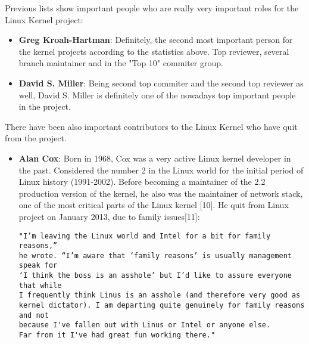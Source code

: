 \documentclass[11pt]{article}
\begin{document}
Previous lists show important people who are really very important roles for the Linux Kernel project:
\begin{itemize}\itemsep0pt
\item{\textbf{Greg Kroah-Hartman}}: Definitely, the second most important person for the kernel projects according to the statistics above. Top reviewer, several branch maintainer and in the "Top 10" commiter group.
\item{\textbf{David S. Miller}}: Being second top commiter and the second top reviewer as well, David S. Miller is definitely one of the nowadays top important people in the project.
\end{itemize}
There have been also important contributors to the Linux Kernel who have quit from the project.
\begin{itemize}\itemsep0pt
\item{\textbf{Alan Cox}}: Born in 1968, Cox was a very active Linux kernel developer in the past. Considered the number 2 in the Linux world for the initial period of Linux history (1991-2002). Before becoming a maintainer of the 2.2 production version of the kernel, he also was the maintainer of network stack, one of the most critical parts of the Linux kernel [10]. He quit from Linux project on January 2013, due to family issues[11]:
\begin{verbatim}
"I’m leaving the Linux world and Intel for a bit for family reasons,” 
he wrote. “I’m aware that ‘family reasons’ is usually management speak for 
‘I think the boss is an asshole’ but I’d like to assure everyone that while
I frequently think Linus is an asshole (and therefore very good as 
kernel dictator). I am departing quite genuinely for family reasons and not
because I've fallen out with Linus or Intel or anyone else. 
Far from it I've had great fun working there."
\end{verbatim}
\end{itemize}
\end{document}
